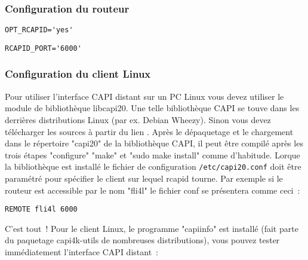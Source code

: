 \subsubsection{Configuration du routeur}

\begin{description}
\verb*?OPT_RCAPID='yes'?

\verb*?RCAPID_PORT='6000'?
\end{description}

\subsubsection{Configuration du client Linux}

  Pour utiliser l'interface CAPI distant sur un PC Linux vous devez utiliser 
  le module de bibliothèque libcapi20. Une telle bibliothèque CAPI se touve
  dans les derrières distributions Linux (par ex. Debian Wheezy). Sinon vous
  devez télécharger les sources à partir du lien 
  .
  Après le dépaquetage et le chargement dans le répertoire "capi20" de la
  bibliothèque CAPI, il peut être compilé après les trois étapes "configure"
  "make" et "sudo make install" comme d'habitude. Lorque la bibliothèque est
  installé le fichier de configuration \texttt{/etc/capi20.conf} doit être paramétré
  pour spécifier le client sur lequel rcapid tourne. Par exemple si le routeur est
  accessible par le nom "fli4l" le fichier conf se présentera comme ceci~:

\begin{example}
\begin{verbatim}
REMOTE fli4l 6000
\end{verbatim}
\end{example}

C'est tout~! Pour le client Linux, le programme "capiinfo" est installé (fait
parte du paquetage capi4k-utils de nombreuses distributions), vous pouvez tester
immédiatement l'interface CAPI distant~:

